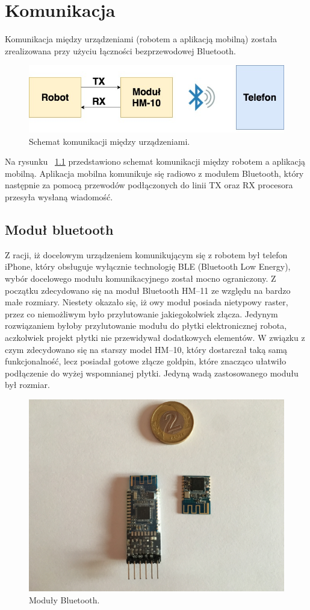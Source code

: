 \chapter{Komunikacja}
Komunikacja między urządzeniami (robotem a aplikacją mobilną) została zrealizowana przy użyciu łączności bezprzewodowej Bluetooth. 

\begin{figure}[H]
	\centering
		\includegraphics[width=0.75\linewidth]{pic03/bt_communications.jpg}
	\caption{Schemat komunikacji między urządzeniami.}
	\label{fig:communication}	
\end{figure}

Na rysunku ~\ref{fig:communication} przedstawiono schemat komunikacji między robotem a aplikacją mobilną. Aplikacja mobilna komunikuje się radiowo z modułem Bluetooth, który następnie za pomocą przewodów podłączonych do linii TX oraz RX procesora przesyła wysłaną wiadomość.   

\section{Moduł bluetooth}
Z racji, iż docelowym urządzeniem komunikującym się z robotem był telefon iPhone, który obsługuje wyłącznie technologię BLE (Bluetooth Low Energy), wybór docelowego modułu komunikacyjnego został mocno ograniczony. Z początku zdecydowano się na moduł Bluetooth HM–11 ze względu na bardzo małe rozmiary. Niestety okazało się, iż owy moduł posiada nietypowy raster, przez co niemożliwym było przylutowanie jakiegokolwiek złącza. Jedynym rozwiązaniem byłoby przylutowanie modułu do płytki elektronicznej robota, aczkolwiek projekt płytki nie przewidywał dodatkowych elementów. W związku z czym zdecydowano się na starszy model HM–10, który dostarczał taką samą funkcjonalność, lecz posiadał gotowe złącze goldpin, które znacząco ułatwiło podłączenie do wyżej wspomnianej płytki. Jedyną wadą zastosowanego modułu był rozmiar.

\begin{figure}[H]
	\centering
		\includegraphics[width=0.75\linewidth]{pic03/bt_modules.jpg}
	\caption{Moduły Bluetooth.}
	\label{fig:bt}	
\end{figure}

